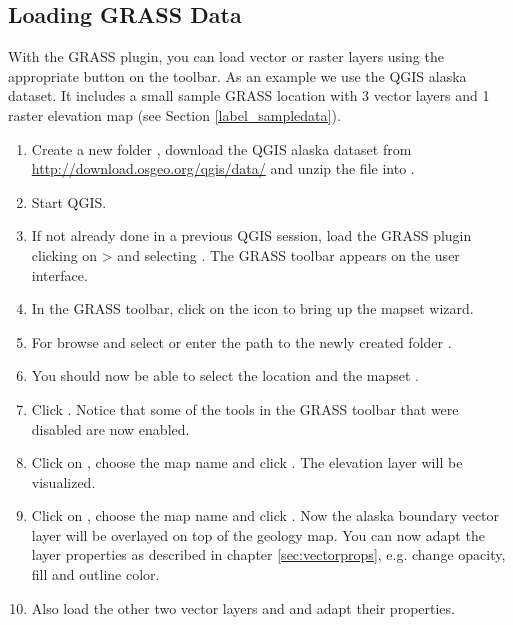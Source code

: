 \subsection{Loading GRASS Data}\label{sec:load_grassdata}

With the GRASS plugin, you can load vector or raster layers using the
appropriate button on the toolbar. As an example we use the QGIS alaska
dataset. It includes a small sample GRASS location with 3 vector layers and 1
raster elevation map (see Section \ref{label_sampledata}).

\begin{enumerate}
  \item Create a new folder , download the QGIS alaska
  dataset  from
  \url{http://download.osgeo.org/qgis/data/} and unzip the file into
  . 
  \item Start QGIS.
  \item If not already done in a previous QGIS session, load the GRASS plugin
  clicking on  >  and
  selecting . The GRASS toolbar appears on the user
  interface.
  \item In the GRASS toolbar, click on the  icon to bring up the mapset wizard.
  \item For  browse and select or enter the path to the
  newly created folder .
  \item You should now be able to select the location 
  and the mapset . 
  \item Click . Notice that some of the tools in the GRASS toolbar
  that were disabled are now enabled.
  \item Click on ,
  choose the map name  and click . The elevation
  layer will be visualized. 
  \item Click on ,
  choose the map name  and click . Now the alaska
  boundary vector layer will be overlayed on top of the geology map. You can
  now adapt the layer properties as described in chapter \ref{sec:vectorprops},
  e.g. change opacity, fill and outline color.
  \item Also load the other two vector layers  and
   and adapt their properties.
\end{enumerate}

